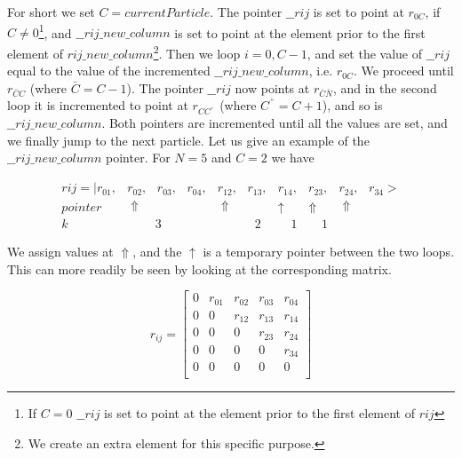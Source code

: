 For short we set $C=currentParticle$.
The pointer $\_\_rij$ is set to point at $r_{0C}$, if $C\ne
0$\footnote{If $C=0$ $\_\_rij$ is set to point at the element prior
  to the first element of $rij$},  
and $\_\_rij\_new\_column$ is set to point at the element
prior to the first element of $rij\_new\_column$\footnote{We
  create an extra element for this specific purpose.}.
Then we loop $i=0,C-1$, and set the value of $\_\_rij$ equal to the value
of the incremented $\_\_rij\_new\_column$, i.e. $r_{0C}$. We proceed
until $r_{\bar{C}C}$ (where $\bar{C}=C-1$). The pointer
$\_\_rij$ now points at $r_{\bar{C}\bar{N}}$, and in the
second loop it is incremented to point at $r_{CC^{^+}}$ (where $C^{^+}=C+1$),
and so is $\_\_rij\_new\_column$. Both pointers are incremented until
all the values are set, and we finally jump to the next particle.
\newline
Let us give an example of the $\_\_rij\_new\_column$ pointer. For $N=5$
and $C=2$ we have

\begin{equation}
  \begin{array}{cccccc}
  rij =
  |r_{01}, &r_{02}, \phantom{A} r_{03}, \phantom{A} r_{04}, &r_{12},
  \phantom{A} r_{13}, &r_{14}, &r_{23},
  &r_{24}, \phantom{A} r_{34}> \\
  pointer& \Uparrow \phantom{AAAAAAA}& \Uparrow \phantom{AAA}& \uparrow &
  \Uparrow & \Uparrow \phantom{AAAA}\\
  k& \phantom{AAA}3 & \phantom{AAAA}2 & \phantom{aa}1 & \phantom{aa}1 & 
  \end{array}
  \label{r_ij_array}
\end{equation}

We assign values at $\Uparrow$, and the $\uparrow$ is a temporary
pointer between the two loops.
This can more readily be seen by
looking at the corresponding matrix.

\begin{equation}
  r_{ij} = \left[
  \begin{array}{ccccc}
    0 & r_{01} & r_{02} & r_{03}  & r_{04}\\
    0 &   0    & r_{12} & r_{13}  & r_{14}\\
    0 &   0    &   0    & r_{23}  & r_{24}\\
    0 &   0    &   0    &   0     & r_{34}\\
    0 &   0    &   0    &   0     &   0   \\
  \end{array} \right]
\end{equation}

